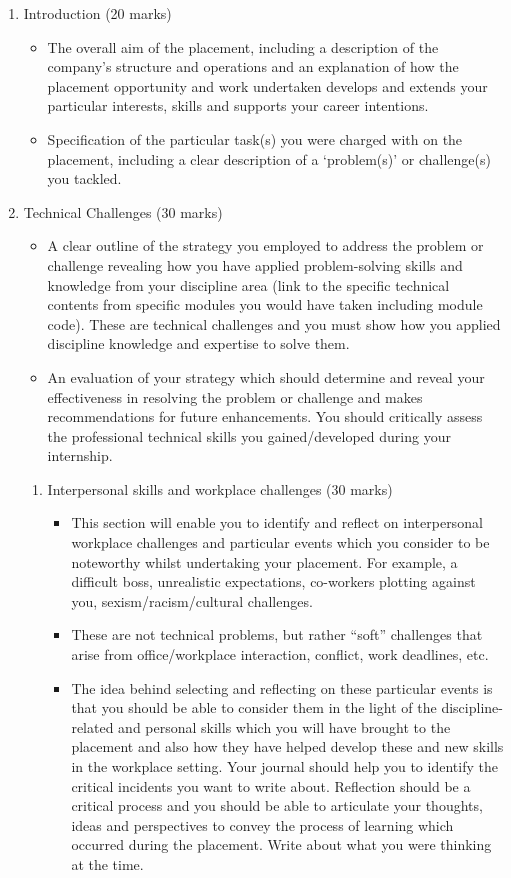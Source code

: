 \documentclass[11pt]{article}
\begin{document}
\begin{enumerate}
\item Introduction (20 marks)
\begin{itemize}
\item The overall aim of the placement, including a description of the company’s structure and operations and an explanation of how the placement opportunity and work undertaken develops and extends your particular interests, skills and supports your career intentions.
\item Specification of the particular task(s) you were charged with on the placement, including a clear description of a ‘problem(s)’ or challenge(s) you tackled.
\end{itemize}
\item Technical Challenges (30 marks)
\begin{itemize}
\item A clear outline of the strategy you employed to address the problem or challenge revealing how you have applied problem-solving skills and knowledge from your discipline area (link to the specific technical contents from specific modules you would have taken including module code). These are technical challenges and you must show how you applied discipline knowledge and expertise to solve them.
\item An evaluation of your strategy which should determine and reveal your effectiveness in resolving the problem or challenge and makes recommendations for future enhancements. You should critically assess the professional technical skills you gained/developed during your internship.
\end{itemize}
\begin{enumerate}
\item Interpersonal skills and workplace challenges (30 marks)
\begin{itemize}
\item This section will enable you to identify and reflect on interpersonal workplace challenges and particular events which you consider to be noteworthy whilst undertaking your placement. For example, a difficult boss, unrealistic expectations, co-workers plotting against you, sexism/racism/cultural challenges.
\item These are not technical problems, but rather “soft” challenges that arise from office/workplace interaction, conflict, work deadlines, etc.
\end{itemize}
\begin{itemize}
\item The idea behind selecting and reflecting on these particular events is that you should be able to consider them in the light of the discipline-related and personal skills which you will have brought to the placement and also how they have helped develop these and new skills in the workplace setting. Your journal should help you to identify the critical incidents you want to write about. Reflection should be a critical process and you should be able to articulate your thoughts, ideas and perspectives to convey the process of learning which occurred during the placement. Write about what you were thinking at the time.

\end{itemize}
\end{enumerate}
\end{enumerate}
\end{document}
